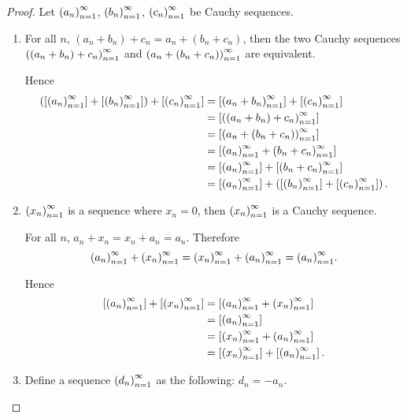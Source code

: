 \begin{proof}
    Let ${\left({a_{n}}\right)}^{\infty}_{n=1}$, ${\left({b_{n}}\right)}^{\infty}_{n=1}$, ${\left({c_{n}}\right)}^{\infty}_{n=1}$ be Cauchy sequences.

    \begin{enumerate}[label={(F\arabic*)},itemsep=0pt]
        \item For all $n$, $(a_{n} + b_{n}) + c_{n} = a_{n} + (b_{n} + c_{n})$, then the two Cauchy sequences ${\left({(a_{n} + b_{n}) + c_{n}}\right)}^{\infty}_{n=1}$ and ${\left({a_{n} + (b_{n} + c_{n})}\right)}^{\infty}_{n=1}$ are equivalent.

              Hence
              \begin{align*}
                  \left(\left[{{\left({a_{n}}\right)}^{\infty}_{n=1}}\right] + \left[{{\left({b_{n}}\right)}^{\infty}_{n=1}}\right]\right) + \left[{{\left({c_{n}}\right)}^{\infty}_{n=1}}\right] & = \left[{{\left({a_{n} + b_{n}}\right)}^{\infty}_{n=1}}\right] + \left[{{\left({c_{n}}\right)}^{\infty}_{n=1}}\right]                             \\
                                                                                               & = \left[{{\left({(a_{n} + b_{n}) + c_{n}}\right)}^{\infty}_{n=1}}\right]                                         \\
                                                                                               & = \left[{{\left({a_{n} + (b_{n} + c_{n})}\right)}^{\infty}_{n=1}}\right]                                         \\
                                                                                               & = \left[{{\left({a_{n}}\right)}^{\infty}_{n=1} + {\left({b_{n} + c_{n}}\right)}^{\infty}_{n=1}}\right]                                     \\
                                                                                               & = \left[{{\left({a_{n}}\right)}^{\infty}_{n=1}}\right] + \left[{{\left({b_{n} + c_{n}}\right)}^{\infty}_{n=1}}\right]                             \\
                                                                                               & = \left[{{\left({a_{n}}\right)}^{\infty}_{n=1}}\right] + \left(\left[{{\left({b_{n}}\right)}^{\infty}_{n=1}}\right] + \left[{{\left({c_{n}}\right)}^{\infty}_{n=1}}\right]\right).
              \end{align*}
        \item ${\left({x_{n}}\right)}^{\infty}_{n=1}$ is a sequence where $x_{n} = 0$, then ${\left({x_{n}}\right)}^{\infty}_{n=1}$ is a Cauchy sequence.

              For all $n$, $a_{n} + x_{n} = x_{n} + a_{n} = a_{n}$. Therefore
              \[
                  {\left({a_{n}}\right)}^{\infty}_{n=1} + {\left({x_{n}}\right)}^{\infty}_{n=1} = {\left({x_{n}}\right)}^{\infty}_{n=1} + {\left({a_{n}}\right)}^{\infty}_{n=1} = {\left({a_{n}}\right)}^{\infty}_{n=1}.
              \]

              Hence
              \begin{align*}
                  \left[{{\left({a_{n}}\right)}^{\infty}_{n=1}}\right] + \left[{{\left({x_{n}}\right)}^{\infty}_{n=1}}\right] & = \left[{{\left({a_{n}}\right)}^{\infty}_{n=1} + {\left({x_{n}}\right)}^{\infty}_{n=1}}\right]          \\
                                                            & = \left[{{\left({a_{n}}\right)}^{\infty}_{n=1}}\right]                        \\
                                                            & = \left[{{\left({x_{n}}\right)}^{\infty}_{n=1} + {\left({a_{n}}\right)}^{\infty}_{n=1}}\right]          \\
                                                            & = \left[{{\left({x_{n}}\right)}^{\infty}_{n=1}}\right] + \left[{{\left({a_{n}}\right)}^{\infty}_{n=1}}\right].
              \end{align*}
        \item Define a sequence ${\left({d_{n}}\right)}^{\infty}_{n=1}$ as the following: $d_{n} = -a_{n}$.


\end{enumerate}
\end{proof}
